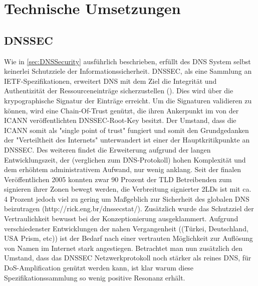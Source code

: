 \chapter{Technische Umsetzungen}

\section{DNSSEC}

Wie in \ref{sec:DNSSecurity} ausführlich beschrieben, erfüllt des DNS System selbst keinerlei Schutzziele der Informationssicherheit. DNSSEC, als eine Sammlung an IETF-Spezifikationen, erweitert DNS mit dem Ziel die Integrität und Authentizität der Ressourceneinträge sicherzustellen (\cite{Arends2005}). Dies wird über die krypographische Signatur der Einträge erreicht. Um die Signaturen validieren zu können, wird eine Chain-Of-Trust genützt, die ihren Ankerpunkt im von der ICANN veröffentlichten DNSSEC-Root-Key besitzt. Der Umstand, dass die ICANN somit als "single point of trust" fungiert und somit den Grundgedanken der "Verteiltheit des Internets" unterwandert ist einer der Hauptkritikpunkte an DNSSEC. Des weiteren findet die Erweiterung aufgrund der langen Entwicklungszeit, der (verglichen zum DNS-Protokoll) hohen Komplexität und dem erhöhtem administrativem Aufwand, nur wenig anklang. Seit der finalen Veröffentlichen 2005 konnten zwar 90 Prozent der TLD Betreibenden zum signieren ihrer Zonen bewegt werden, die Verbreitung signierter 2LDs ist mit ca. 4 Prozent jedoch viel zu gering um Maßgeblich zur Sicherheit des globalen DNS beizutragen (http://rick.eng.br/dnssecstat/). Zusätzlich wurde das Schutzziel der Vertraulichkeit bewusst bei der Konzeptionierung ausgeklammert. Aufgrund verschiedenster Entwicklungen der nahen Vergangenheit ((Türkei, Deutschland, USA Prism, etc)) ist der Bedarf nach einer vertrauten Möglichkeit zur Auflösung von Namen im Internet stark angestiegen. Betrachtet man nun zusätzlich den Umstand, dass das DNSSEC Netzwerkprotokoll noch stärker als reines DNS, für DoS-Amplification genützt werden kann, ist klar warum diese Spezifikationssammlung so wenig positive Resonanz erhält.


